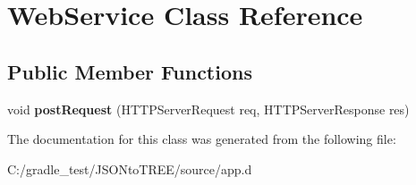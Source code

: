 \hypertarget{class_web_service}{}\section{Web\+Service Class Reference}
\label{class_web_service}
\subsection*{Public Member Functions}
\begin{DoxyCompactItemize}
\item 
\mbox{\label{class_web_service_ab5c0bd478989f985245777f0009fc55a}} 
void {\bfseries post\+Request} (H\+T\+T\+P\+Server\+Request req, H\+T\+T\+P\+Server\+Response res)
\end{DoxyCompactItemize}


The documentation for this class was generated from the following file\+:\begin{DoxyCompactItemize}
\item 
C\+:/gradle\+\_\+test/\+J\+S\+O\+Nto\+T\+R\+E\+E/source/app.\+d\end{DoxyCompactItemize}
